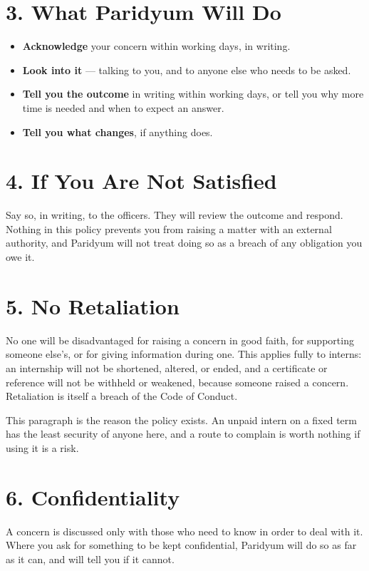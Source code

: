 \documentclass{paridyum}
\begin{document}
\section*{3. What Paridyum Will Do}
\begin{itemize}[leftmargin=*, noitemsep]
    \item \textbf{Acknowledge} your concern within \dkOrgGrievanceAcknowledgeDays{}
          working days, in writing.
    \item \textbf{Look into it} --- talking to you, and to anyone else who needs
          to be asked.
    \item \textbf{Tell you the outcome} in writing within
          \dkOrgGrievanceOutcomeDays{} working days, or tell you why more time
          is needed and when to expect an answer.
    \item \textbf{Tell you what changes}, if anything does.
\end{itemize}

\section*{4. If You Are Not Satisfied}
Say so, in writing, to the officers. They will review the outcome and respond.
Nothing in this policy prevents you from raising a matter with an external
authority, and Paridyum will not treat doing so as a breach of any obligation
you owe it.

\section*{5. No Retaliation}
No one will be disadvantaged for raising a concern in good faith, for
supporting someone else's, or for giving information during one. This applies
fully to interns: an internship will not be shortened, altered, or ended, and a
certificate or reference will not be withheld or weakened, because someone
raised a concern. Retaliation is itself a breach of the Code of Conduct.

This paragraph is the reason the policy exists. An unpaid intern on a fixed
term has the least security of anyone here, and a route to complain is worth
nothing if using it is a risk.

\section*{6. Confidentiality}
A concern is discussed only with those who need to know in order to deal with
it. Where you ask for something to be kept confidential, Paridyum will do so as
far as it can, and will tell you if it cannot.
\end{document}
